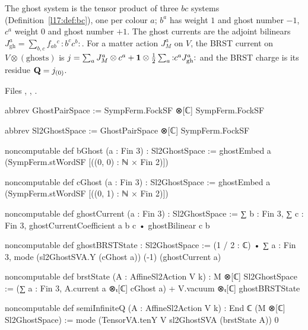 \begin{definition}\label{l28:def:charge}
The ghost system is the tensor product of three $bc$ systems (Definition~\ref{l17:def:bc}), one per colour $a$; $b^a$ has weight
$1$ and ghost number $-1$, $c^a$ weight $0$ and ghost number $+1$. The ghost currents are the adjoint bilinears $J^a_{\mathrm{gh}}=\sum_{b,c}f_{ab}{}^{c}\,{:}b^{c}c^{b}{:}$. For a matter action $J^a_M$ on $V$, the BRST current on $V\otimes(\text{ghosts})$ is
$j=\sum_aJ^a_M\otimes c^a+\mathbf 1\otimes\tfrac12\sum_a{:}c^aJ^a_{\mathrm{gh}}{:}$ and the BRST charge is its residue
$\mathbf Q=j_{(0)}$.
\end{definition}

\noindent Files , ,
.
\begin{leancode}
abbrev GhostPairSpace := SympFerm.FockSF ⊗[ℂ] SympFerm.FockSF

abbrev Sl2GhostSpace := GhostPairSpace ⊗[ℂ] SympFerm.FockSF

noncomputable def bGhost (a : Fin 3) : Sl2GhostSpace :=
  ghostEmbed a (SympFerm.stWordSF [((0, 0) : ℕ × Fin 2)])

noncomputable def cGhost (a : Fin 3) : Sl2GhostSpace :=
  ghostEmbed a (SympFerm.stWordSF [((0, 1) : ℕ × Fin 2)])

noncomputable def ghostCurrent (a : Fin 3) : Sl2GhostSpace :=
  ∑ b : Fin 3, ∑ c : Fin 3, ghostCurrentCoefficient a b c • ghostBilinear c b

noncomputable def ghostBRSTState : Sl2GhostSpace :=
  (1 / 2 : ℂ) • ∑ a : Fin 3,
    mode (sl2GhostSVA.Y (cGhost a)) (-1) (ghostCurrent a)

noncomputable def brstState (A : AffineSl2Action V k) : M ⊗[ℂ] Sl2GhostSpace :=
  (∑ a : Fin 3, A.current a ⊗ₜ[ℂ] cGhost a) + V.vacuum ⊗ₜ[ℂ] ghostBRSTState

noncomputable def semiInfiniteQ (A : AffineSl2Action V k) : End ℂ (M ⊗[ℂ] Sl2GhostSpace) :=
  mode (TensorVA.tenY V sl2GhostSVA (brstState A)) 0
\end{leancode}

